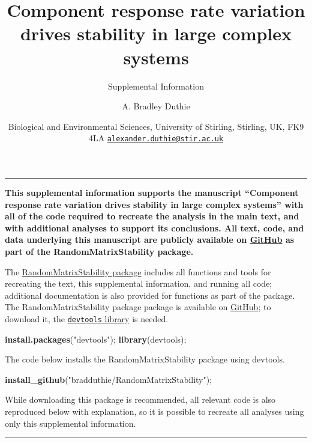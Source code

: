 \documentclass[]{article}
\title{Component response rate variation drives stability in large complex
systems}
\subtitle{Supplemental Information}
\author{A. Bradley Duthie}
\date{Biological and Environmental Sciences, University of Stirling, Stirling,
UK, FK9 4LA
\href{mailto:alexander.duthie@stir.ac.uk}{\nolinkurl{alexander.duthie@stir.ac.uk}}}
\newenvironment{Shaded}{\begin{snugshade}}{\end{snugshade}}
\newcommand{\KeywordTok}[1]{\textcolor[rgb]{0.13,0.29,0.53}{\textbf{{#1}}}}
\newcommand{\StringTok}[1]{\textcolor[rgb]{0.31,0.60,0.02}{{#1}}}
\newcommand{\NormalTok}[1]{{#1}}
\begin{document}
\maketitle

\begin{center}\rule{0.5\linewidth}{\linethickness}\end{center}

\textbf{This supplemental information supports the manuscript
``Component response rate variation drives stability in large complex
systems'' with all of the code required to recreate the analysis in the
main text, and with additional analyses to support its conclusions. All
text, code, and data underlying this manuscript are publicly available
on \href{https://github.com/bradduthie/RandomMatrixStability}{GitHub} as
part of the RandomMatrixStability package.}

The
\href{https://github.com/bradduthie/RandomMatrixStability}{RandomMatrixStability
package} includes all functions and tools for recreating the text, this
supplemental information, and running all code; additional documentation
is also provided for functions as part of the package. The
RandomMatrixStability package package is available on
\href{https://github.com/bradduthie/RandomMatrixStability}{GitHub}; to
download it, the
\href{https://cran.r-project.org/web/packages/devtools/index.html}{\texttt{devtools}
library} is needed.

\begin{Shaded}
\begin{Highlighting}[]
\KeywordTok{install.packages}\NormalTok{(}\StringTok{"devtools"}\NormalTok{);}
\KeywordTok{library}\NormalTok{(devtools);}
\end{Highlighting}
\end{Shaded}

The code below installs the RandomMatrixStability package using
devtools.

\begin{Shaded}
\begin{Highlighting}[]
\KeywordTok{install_github}\NormalTok{(}\StringTok{"bradduthie/RandomMatrixStability"}\NormalTok{);}
\end{Highlighting}
\end{Shaded}

While downloading this package is recommended, all relevant code is also
reproduced below with explanation, so it is possible to recreate all
analyses using only this supplemental information.

\begin{center}\rule{0.5\linewidth}{\linethickness}\end{center}
\end{document}
